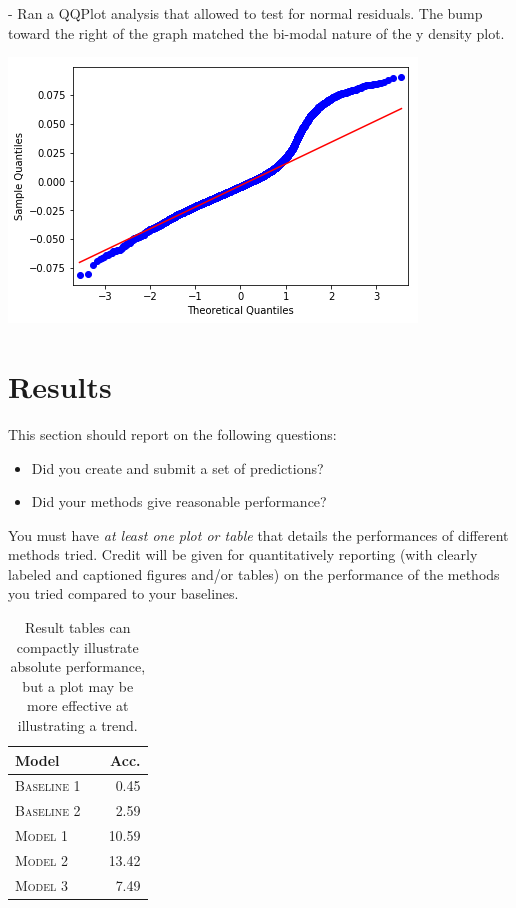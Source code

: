 \documentclass[11pt]{article}
\begin{document}
- Ran a QQPlot analysis that allowed to test for normal residuals. The bump toward the right of the graph matched the bi-modal nature of the y density plot. 
\begin{center}
	\includegraphics[scale=0.6]{qqplot}
\end{center}

\section{Results}
This section should report on the following questions: 

\begin{itemize}
\item Did you create and submit a set of
  predictions? 
  

\item  Did your methods give reasonable performance?  
\end{itemize}

\noindent You must have \textit{at least one plot or table}
that details the performances of different methods tried. 
Credit will be given for quantitatively reporting (with clearly
labeled and captioned figures and/or tables) on the performance of the
methods you tried compared to your baselines.



\begin{table}
\centering
\begin{tabular}{llr}
 \toprule
 Model &  & Acc. \\
 \midrule
 \textsc{Baseline 1} & & 0.45\\
 \textsc{Baseline 2} & & 2.59 \\
 \textsc{Model 1} & & 10.59  \\
 \textsc{Model 2} & &13.42 \\
 \textsc{Model 3} & & 7.49\\
 \bottomrule
\end{tabular}
\caption{\label{tab:results} Result tables can compactly illustrate absolute performance, but a plot may be more effective at illustrating a trend.}
\end{table}
\end{document}
